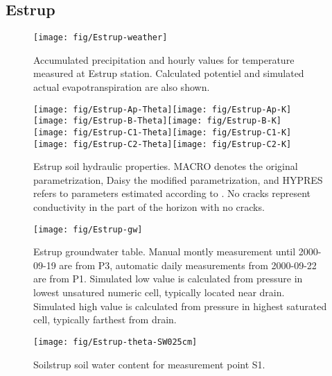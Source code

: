 \subsection*{Estrup}

\begin{figure}[htbp]
  \begin{center}
    \texttt{[image: fig/Estrup-weather]}
  \end{center}
  \caption{Accumulated precipitation and hourly values for temperature
    measured at Estrup station.  Calculated potentiel and simulated
    actual evapotranspiration are also shown.}
  \label{fig:Estrup-weather}
\end{figure}\FloatBarrier

\begin{figure}[htbp] 
  \texttt{[image: fig/Estrup-Ap-Theta]}\texttt{[image: fig/Estrup-Ap-K]}\\
  \texttt{[image: fig/Estrup-B-Theta]}\texttt{[image: fig/Estrup-B-K]}\\
  \texttt{[image: fig/Estrup-C1-Theta]}\texttt{[image: fig/Estrup-C1-K]}\\
  \texttt{[image: fig/Estrup-C2-Theta]}\texttt{[image: fig/Estrup-C2-K]}
  \caption{Estrup soil hydraulic properties.  MACRO denotes the
    original parametrization, Daisy the modified parametrization, and
    HYPRES refers to parameters estimated according to \citet{hypres}.
    No cracks represent conductivity in the part of the horizon with
    no cracks.}
  \label{fig:Estrup-hor}
\end{figure}\FloatBarrier

\begin{figure}[htbp]
  \begin{center}
    \texttt{[image: fig/Estrup-gw]}
  \end{center}
  \caption{Estrup groundwater table.  Manual montly measurement until
    2000-09-19 are from P3, automatic daily measurements from
    2000-09-22 are from P1.  Simulated low value is calculated from
    pressure in lowest unsatured numeric cell, typically located near
    drain.  Simulated high value is calculated from pressure in
    highest saturated cell, typically farthest from drain.}
  \label{fig:Estrup-gw}
\end{figure}\FloatBarrier

\begin{figure}[htbp]
  \begin{center}
    \texttt{[image: fig/Estrup-theta-SW025cm]}
  \end{center}
  \caption{Soilstrup soil water content for measurement point S1.}
  \label{fig:Estrup-theta}
\end{figure}\FloatBarrier

